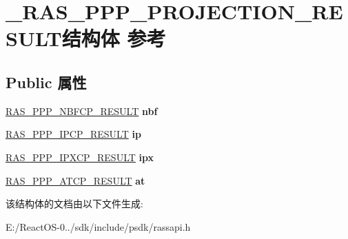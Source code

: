 \hypertarget{struct___r_a_s___p_p_p___p_r_o_j_e_c_t_i_o_n___r_e_s_u_l_t}{}\section{\+\_\+\+R\+A\+S\+\_\+\+P\+P\+P\+\_\+\+P\+R\+O\+J\+E\+C\+T\+I\+O\+N\+\_\+\+R\+E\+S\+U\+L\+T结构体 参考}
\label{struct___r_a_s___p_p_p___p_r_o_j_e_c_t_i_o_n___r_e_s_u_l_t}
\subsection*{Public 属性}
\begin{DoxyCompactItemize}
\item 
\mbox{\label{struct___r_a_s___p_p_p___p_r_o_j_e_c_t_i_o_n___r_e_s_u_l_t_ae98284f0580a5be555cc2544f12338f4}} 
\hyperlink{struct___r_a_s___p_p_p___n_b_f_c_p___r_e_s_u_l_t}{R\+A\+S\+\_\+\+P\+P\+P\+\_\+\+N\+B\+F\+C\+P\+\_\+\+R\+E\+S\+U\+LT} {\bfseries nbf}
\item 
\mbox{\label{struct___r_a_s___p_p_p___p_r_o_j_e_c_t_i_o_n___r_e_s_u_l_t_a6a558c71fc5a5a145a2695aa86fad26a}} 
\hyperlink{struct___r_a_s___p_p_p___i_p_c_p___r_e_s_u_l_t}{R\+A\+S\+\_\+\+P\+P\+P\+\_\+\+I\+P\+C\+P\+\_\+\+R\+E\+S\+U\+LT} {\bfseries ip}
\item 
\mbox{\label{struct___r_a_s___p_p_p___p_r_o_j_e_c_t_i_o_n___r_e_s_u_l_t_a371d2ccb61944bb142030250622a6c92}} 
\hyperlink{struct___r_a_s___p_p_p___i_p_x_c_p___r_e_s_u_l_t}{R\+A\+S\+\_\+\+P\+P\+P\+\_\+\+I\+P\+X\+C\+P\+\_\+\+R\+E\+S\+U\+LT} {\bfseries ipx}
\item 
\mbox{\label{struct___r_a_s___p_p_p___p_r_o_j_e_c_t_i_o_n___r_e_s_u_l_t_a4159f3a34a0a4582b4fdd9a8dc74d991}} 
\hyperlink{struct___r_a_s___p_p_p___a_t_c_p___r_e_s_u_l_t}{R\+A\+S\+\_\+\+P\+P\+P\+\_\+\+A\+T\+C\+P\+\_\+\+R\+E\+S\+U\+LT} {\bfseries at}
\end{DoxyCompactItemize}


该结构体的文档由以下文件生成\+:\begin{DoxyCompactItemize}
\item 
E\+:/\+React\+O\+S-\/0../sdk/include/psdk/rassapi.\+h\end{DoxyCompactItemize}
